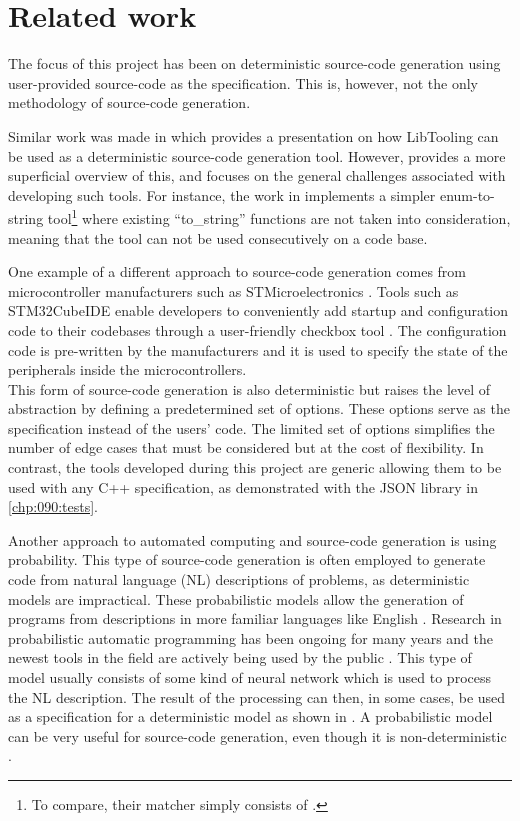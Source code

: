 \chapter{Related work}

The focus of this project has been on deterministic source-code generation using user-provided source-code as the specification. This is, however, not the only methodology of source-code generation.

Similar work was made in \cite{sadovnikovUsingClangSource} which provides a presentation on how LibTooling can be used as a deterministic source-code generation tool.
However, \cite{sadovnikovUsingClangSource} provides a more superficial overview of this, and focuses on the general challenges associated with developing such tools.
For instance, the work in \cite{sadovnikovUsingClangSource} implements a simpler enum-to-string tool\footnote{
    To compare, their matcher simply consists of .
} where existing ``to\_string'' functions are not taken into consideration, meaning that the tool can not be used consecutively on a code base.

One example of a different approach to source-code generation comes from microcontroller manufacturers such as STMicroelectronics \cite{stmSTMicroelectronicsOurTechnology}.
Tools such as STM32CubeIDE enable developers to conveniently add startup and configuration code to their codebases through a user-friendly checkbox tool \cite{stmSTM32CubeDevelopmentSoftware}.
The configuration code is pre-written by the manufacturers and it is used to specify the state of the peripherals inside the microcontrollers.\\
This form of source-code generation is also deterministic but raises the level of abstraction by defining a predetermined set of options. These options serve as the specification instead of the users' code.
The limited set of options simplifies the number of edge cases that must be considered but at the cost of flexibility.
In contrast, the tools developed during this project are generic allowing them to be used with any C++ specification, as demonstrated with the JSON library \cite{lohmannJSONModern2022} in \cref{chp:090:tests}.

Another approach to automated computing and source-code generation is using probability. 
This type of source-code generation is often employed to generate code from natural language (NL) descriptions of problems, as deterministic models are impractical. 
These probabilistic models allow the generation of programs from descriptions in more familiar languages like English \cite{alonStructuralLanguageModels2020}.
Research in probabilistic automatic programming has been ongoing for many years and the newest tools in the field are actively being used by the public \cite{WhatChatGPTWhy, johnmaedaChoosingLLMModel2023}.
This type of model usually consists of some kind of neural network which is used to process the NL description. 
The result of the processing can then, in some cases, be used as a specification for a deterministic model as shown in \cite{yinSyntacticNeuralModel2017}. 
A probabilistic model can be very useful for source-code generation, even though it is non-deterministic \cite{chenEvaluatingLargeLanguage2021}.